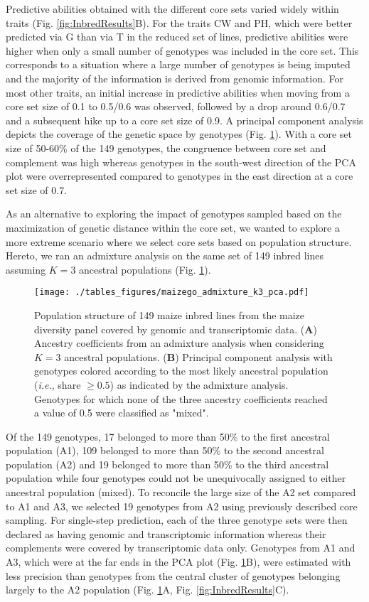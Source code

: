 \documentclass[12pt,titlepage]{article}
\begin{document}
Predictive abilities obtained with the different core sets varied widely within
traits (Fig. \ref{fig:InbredResults}B).
For the traits CW and PH, which were better predicted via G than via T in the 
reduced set of lines, predictive abilities were higher when only a small number 
of genotypes was included in the core set.
This corresponds to a situation where a large number of genotypes is being 
imputed and the majority of the information is derived from genomic information. 
For most other traits, an initial increase in predictive abilities when moving
from a core set size of 0.1 to 0.5/0.6 was observed, followed by a drop around
0.6/0.7 and a subsequent hike up to a core set size of 0.9.
A principal component analysis depicts the coverage of the genetic space by
genotypes (Fig. \ref{fig:PopStructure}).
With a core set size of 50-60\% of the 149 genotypes, the congruence between
core set and complement was high whereas genotypes in the south-west direction
of the PCA plot were overrepresented compared to genotypes in the east 
direction at a core set size of 0.7.

As an alternative to exploring the impact of genotypes sampled based on the
maximization of genetic distance within the core set, we wanted to explore a
more extreme scenario where we select core sets based on population structure.
Hereto, we ran an admixture analysis on the same set of 149 inbred lines 
assuming $K=3$ ancestral populations (Fig. \ref{fig:PopStructure}).

\begin{figure}[H]
\centering
\texttt{[image: ./tables\_figures/maizego\_admixture\_k3\_pca.pdf]}
\caption{
  Population structure of 149 maize inbred lines from the maize diversity panel
  covered by genomic and transcriptomic data.
  (\textbf{A}) Ancestry coefficients from an admixture analysis when 
  considering $K=3$ ancestral populations.
  (\textbf{B}) Principal component analysis with genotypes colored according to 
  the most likely ancestral population (\textit{i.e.}, share $\geq 0.5$) as 
  indicated by the admixture analysis.
  Genotypes for which none of the three ancestry coefficients reached a value
  of 0.5 were classified as "mixed".
}
\label{fig:PopStructure}
\end{figure}


Of the 149 genotypes, 17 belonged to more than 50\% to the first ancestral
population (A1), 109 belonged to more than 50\% to the second ancestral
population (A2) and 19 belonged to more than 50\% to the third ancestral
population while four genotypes could not be unequivocally assigned to either
ancestral population (mixed).
To reconcile the large size of the A2 set compared to A1 and A3, we selected 19 
genotypes from A2 using previously described core sampling.
For single-step prediction, each of the three genotype sets were then declared
as having genomic and transcriptomic information whereas their complements were
covered by transcriptomic data only.
Genotypes from A1 and A3, which were at the far ends in the PCA plot (Fig.
\ref{fig:PopStructure}B), were estimated with less precision than genotypes
from the central cluster of genotypes belonging largely to the A2 population
(Fig. \ref{fig:PopStructure}A, Fig. \ref{fig:InbredResults}C).
\end{document}
